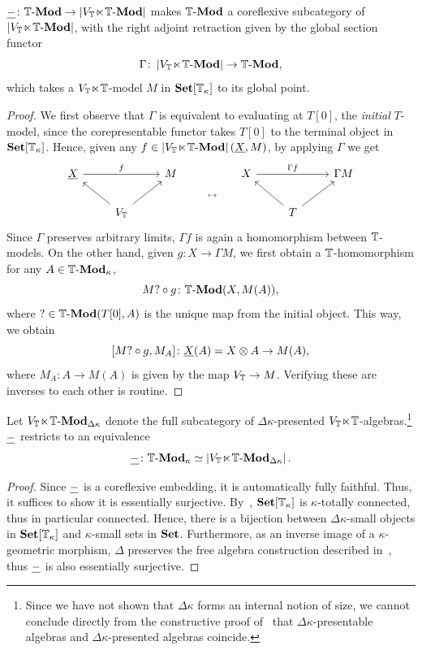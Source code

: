 \begin{proposition}\label{prop:internalrep}
  $\underline{-} \colon \mathbb{T}\text{-}\mathbf{Mod} \to \left|V_{\mathbb{T}}\hspace{-.4ex}\ltimes\hspace{-.4ex}\mathbb{T}\text{-}\mathbf{Mod}\right|$ makes $\mathbb{T}\text{-}\mathbf{Mod}$ a coreflexive subcategory of $\left|V_{\mathbb{T}}\hspace{-.4ex}\ltimes\hspace{-.4ex}\mathbb{T}\text{-}\mathbf{Mod}\right|$, with the right adjoint retraction given by the global section functor
  \[ \Gamma \colon \left|V_{\mathbb{T}}\hspace{-.4ex}\ltimes\hspace{-.4ex}\mathbb{T}\text{-}\mathbf{Mod}\right| \to \mathbb{T}\text{-}\mathbf{Mod}, \]
  which takes a $V_{\mathbb{T}}\hspace{-.4ex}\ltimes\hspace{-.4ex}\mathbb{T}$-model $M$ in $\mathbf{Set}[\mathbb{T}_\kappa]$ to its global point.
\end{proposition}
\begin{proof}
  We first observe that $\Gamma$ is equivalent to evaluating at $T[0]$, the \emph{initial} $T$-model, since the corepresentable functor takes $T[0]$ to the terminal object in $\mathbf{Set}[\mathbb{T}_\kappa]$. Hence, given any $f \in \left|V_{\mathbb{T}}\hspace{-.4ex}\ltimes\hspace{-.4ex}\mathbb{T}\text{-}\mathbf{Mod}\right|(\underline{X},M)$, by applying $\Gamma$ we get
  \[
  \begin{tikzcd}
    {\uv X} && M && X && {\Gamma M} \\
    & {V_\T} &&& {} & T
    \arrow["f", from=1-1, to=1-3]
    \arrow["\mapsto"{description}, draw=none, from=1-3, to=2-5]
    \arrow["{\Gamma f}", from=1-5, to=1-7]
    \arrow[from=2-2, to=1-1]
    \arrow[from=2-2, to=1-3]
    \arrow[from=2-6, to=1-5]
    \arrow[from=2-6, to=1-7]
  \end{tikzcd}
  \]
  Since $\Gamma$ preserves arbitrary limits, $\Gamma f$ is again a homomorphism between $\mathbb{T}$-models. On the other hand, given $g \colon X \to \Gamma M$, we first obtain a $\mathbb{T}$-homomorphism for any $A \in \mathbb{T}\text{-}\mathbf{Mod}_\kappa$,
  \[ M? \circ g \colon \mathbb{T}\text{-}\mathbf{Mod}(X,M(A)), \]
  where $? \in \mathbb{T}\text{-}\mathbf{Mod}(T[0],A)$ is the unique map from the initial object. This way, we obtain
  \[ [M?\circ g,M_A] \colon \underline{X}(A) = X \otimes A \to M(A), \]
  where $M_A \colon A \to M(A)$ is given by the map $V_{\mathbb{T}} \to M$. Verifying these are inverses to each other is routine. 
\end{proof}

\begin{corollary}\label{cor:cpalgebraabsolute}
  Let $V_{\mathbb{T}}\hspace{-.4ex}\ltimes\hspace{-.4ex}\mathbb{T}\text{-}\mathbf{Mod}_{\Delta\kappa}$ denote the full subcategory of $\Delta\kappa$-presented $V_{\mathbb{T}}\hspace{-.4ex}\ltimes\hspace{-.4ex}\mathbb{T}$-algebras.\footnote{Since we have not shown that $\Delta\kappa$ forms an internal notion of size, we cannot conclude directly from the constructive proof of~ that $\Delta\kappa$-presentable algebras and $\Delta\kappa$-presented algebras coincide.} $\underline{-}$ restricts to an equivalence
  \[ \underline{-} \colon \mathbb{T}\text{-}\mathbf{Mod}_\kappa \simeq \left|V_{\mathbb{T}}\hspace{-.4ex}\ltimes\hspace{-.4ex}\mathbb{T}\text{-}\mathbf{Mod}_{\Delta\kappa}\right|. \]
\end{corollary}
\begin{proof}
  Since $\underline{-}$ is a coreflexive embedding, it is automatically fully faithful. Thus, it suffices to show it is essentially surjective. By~, $\mathbf{Set}[\mathbb{T}_\kappa]$ is $\kappa$-totally connected, thus in particular connected. Hence, there is a bijection between $\Delta\kappa$-small objects in $\mathbf{Set}[\mathbb{T}_\kappa]$ and $\kappa$-small sets in $\mathbf{Set}$. Furthermore, as an inverse image of a $\kappa$-geometric morphism, $\Delta$ preserves the free algebra construction described in~, thus $\underline{-}$ is also essentially surjective.
\end{proof}

